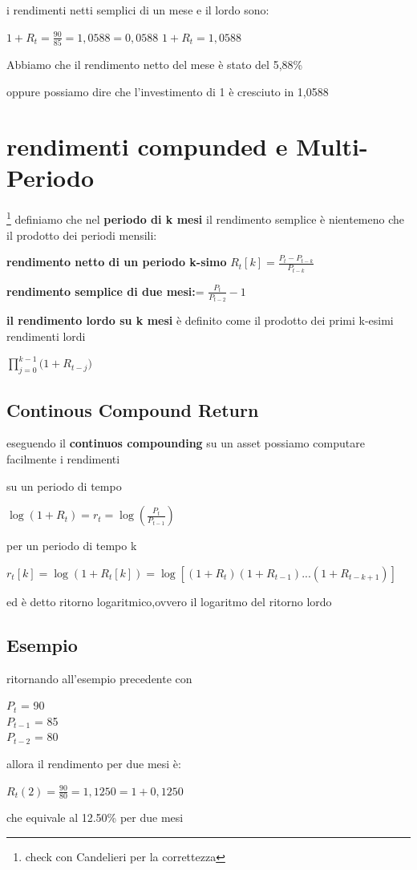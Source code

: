 \documentclass[a4paper,11pt]{report}
\begin{document}
{	i rendimenti netti semplici di un mese e il lordo sono:
\begin{center}
	$1+R_t={\frac{90}{85}} = 1,0588= 0,0588$ \newline
	$1+R_t = 1,0588$
\end{center}
	Abbiamo che il rendimento netto del mese è stato del 5,88\%

	oppure possiamo dire che l'investimento di 1 è cresciuto in 1,0588
\section{rendimenti compunded e Multi-Periodo} \footnote{check con Candelieri per la correttezza}
	definiamo che nel \textbf{periodo di k mesi} il rendimento semplice è nientemeno che il prodotto dei periodi mensili:

	\textbf{rendimento netto di un periodo k-simo}	$R_t[k]= {\frac{P_t-P_{t-k}}{P_{t-k}}} $

	\textbf{rendimento semplice di due mesi:}= ${\frac {P_t}{P_{t-2}}} - 1 $

	\textbf{il rendimento lordo su k mesi } è definito come il prodotto dei primi k-esimi rendimenti lordi
\begin{center}
	${\prod\limits_{j=0}^{k-1}({1+R_{t-j}}})$
\end{center}
\subsection{Continous Compound Return}
	eseguendo  il \textbf{continuos compounding} su un asset possiamo computare facilmente i rendimenti

	su un periodo di tempo
\begin{center}
	$\log{(1+R_t)} = r_t =\log{({\frac {P_t}{P_{t-1}}})}$
\end{center}
	per un periodo di tempo k
\begin{center}
	$r_t[k]= \log{(1+R_t[k])} =\log{[(1+R_t)(1+R_{t-1})  ...(1+R_{t-k+1})]}$
\end{center}
	ed è detto ritorno logaritmico,ovvero il logaritmo del ritorno lordo
\subsection{Esempio}
	ritornando all'esempio precedente con
	\begin{center}
	$P_t$ = 90  \\
	$P_{t-1}$ = 85 \\
	$P_{t-2}$ = 80 \\
	\end{center}
	allora il rendimento per due mesi è:
	\begin{center}
	$R_t(2) = {\frac {90}{80}}  = 1,1250=1+0,1250 $
	\end{center}
	che equivale al 12.50\% per due mesi

}
\end{document}
